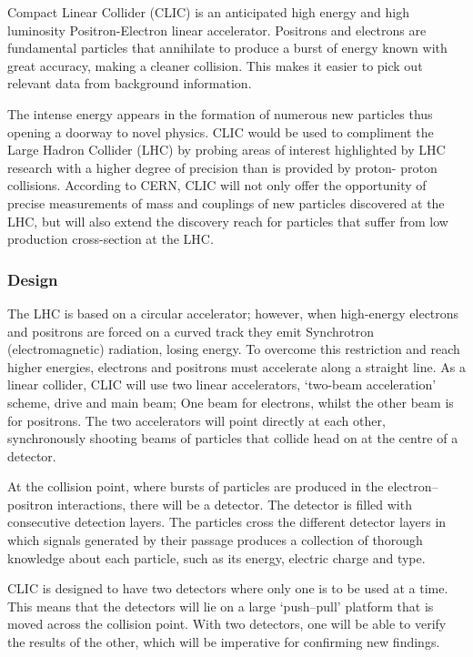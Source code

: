 Compact Linear Collider (CLIC) is an anticipated high energy and high luminosity Positron-Electron linear accelerator. Positrons and electrons are fundamental particles that annihilate to produce a burst of energy known with great accuracy, making a cleaner collision. This makes it easier to pick out relevant data from background information.

The intense energy appears in the formation of numerous new particles thus opening a doorway to novel physics. CLIC would be used to compliment the Large Hadron Collider (LHC) by probing areas of interest highlighted by LHC research with a higher degree of precision than is provided by proton- proton collisions. According to CERN, CLIC will not only offer the opportunity of precise measurements of mass and couplings of new particles discovered at the LHC, but will also extend the discovery reach for particles that suffer from low production cross-section at the LHC. \cite{LHC:CP:Higgs}

\subsubsection{Design}

The LHC is based on a circular accelerator; however, when high-energy electrons and positrons are forced on a curved track they emit Synchrotron (electromagnetic) radiation, losing energy. To overcome this restriction and reach higher energies, electrons and positrons must accelerate along a straight line. As a linear collider, CLIC will use two linear accelerators, ‘two-beam acceleration’ scheme, drive and main beam; One beam for electrons, whilst the other beam is for positrons. The two accelerators will point directly at each other, synchronously shooting beams of particles that collide head on at the centre of a detector.

At the collision point, where bursts of particles are produced in the electron–positron interactions, there will be a detector. The detector is filled with consecutive detection layers. The particles cross the different detector layers in which signals generated by their passage produces a collection of thorough knowledge about each particle, such as its energy, electric charge and type.

CLIC is designed to have two detectors where only one is to be used at a time. This means that the detectors will lie on a large ‘push–pull’ platform that is moved across the collision point. With two detectors, one will be able to verify the results of the other, which will be imperative for confirming new findings.

